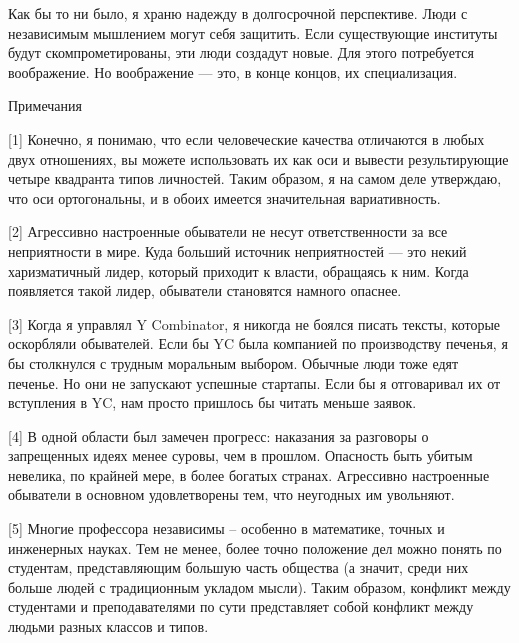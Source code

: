 \documentclass[ebook,12pt,oneside,openany]{memoir}
\begin{document}
Как бы то ни было, я храню надежду в долгосрочной перспективе. Люди с
независимым мышлением могут себя защитить. Если существующие институты
будут скомпрометированы, эти люди создадут новые. Для этого
потребуется воображение. Но воображение — это, в конце концов, их
специализация.

Примечания

[1] Конечно, я понимаю, что если человеческие качества отличаются в
любых двух отношениях, вы можете использовать их как оси и вывести
результирующие четыре квадранта типов личностей. Таким образом, я на
самом деле утверждаю, что оси ортогональны, и в обоих имеется
значительная вариативность.

[2] Агрессивно настроенные обыватели не несут ответственности за все
неприятности в мире. Куда больший источник неприятностей — это некий
харизматичный лидер, который приходит к власти, обращаясь к ним. Когда
появляется такой лидер, обыватели становятся намного опаснее.

[3] Когда я управлял Y Combinator, я никогда не боялся писать тексты,
которые оскорбляли обывателей. Если бы YC была компанией по
производству печенья, я бы столкнулся с трудным моральным выбором.
Обычные люди тоже едят печенье. Но они не запускают успешные стартапы.
Если бы я отговаривал их от вступления в YC, нам просто пришлось бы
читать меньше заявок.

[4] В одной области был замечен прогресс: наказания за разговоры о
запрещенных идеях менее суровы, чем в прошлом. Опасность быть убитым
невелика, по крайней мере, в более богатых странах. Агрессивно
настроенные обыватели в основном удовлетворены тем, что неугодных им
увольняют.

[5] Многие профессора независимы – особенно в математике, точных и
инженерных науках. Тем не менее, более точно положение дел можно
понять по студентам, представляющим большую часть общества (а значит,
среди них больше людей с традиционным укладом мысли). Таким образом,
конфликт между студентами и преподавателями по сути представляет собой
конфликт между людьми разных классов и типов.
\end{document}

